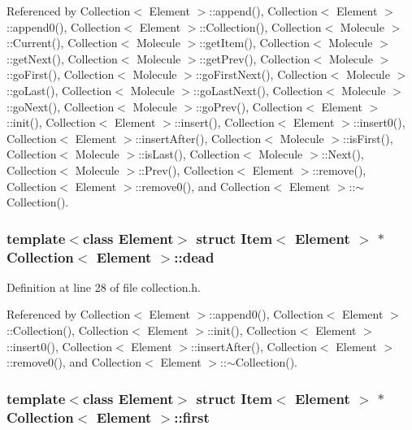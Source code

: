 Referenced by Collection$<$ Element $>$::append(), Collection$<$ Element $>$::append0(), Collection$<$ Element $>$::Collection(), Collection$<$ Molecule $>$::Current(), Collection$<$ Molecule $>$::getItem(), Collection$<$ Molecule $>$::getNext(), Collection$<$ Molecule $>$::getPrev(), Collection$<$ Molecule $>$::goFirst(), Collection$<$ Molecule $>$::goFirstNext(), Collection$<$ Molecule $>$::goLast(), Collection$<$ Molecule $>$::goLastNext(), Collection$<$ Molecule $>$::goNext(), Collection$<$ Molecule $>$::goPrev(), Collection$<$ Element $>$::init(), Collection$<$ Element $>$::insert(), Collection$<$ Element $>$::insert0(), Collection$<$ Element $>$::insertAfter(), Collection$<$ Molecule $>$::isFirst(), Collection$<$ Molecule $>$::isLast(), Collection$<$ Molecule $>$::Next(), Collection$<$ Molecule $>$::Prev(), Collection$<$ Element $>$::remove(), Collection$<$ Element $>$::remove0(), and Collection$<$ Element $>$::$\sim$Collection().\hypertarget{classCollection_f67771496391118583fcebee252a96cc}{
\subsubsection[{dead}]{\setlength{\rightskip}{0pt plus 5cm}template$<$class Element$>$ struct {\bf Item}$<$ Element $>$ $\ast$ {\bf Collection}$<$ Element $>$::{\bf dead}}}
\label{classCollection_f67771496391118583fcebee252a96cc}




Definition at line 28 of file collection.h.

Referenced by Collection$<$ Element $>$::append0(), Collection$<$ Element $>$::Collection(), Collection$<$ Element $>$::init(), Collection$<$ Element $>$::insert0(), Collection$<$ Element $>$::insertAfter(), Collection$<$ Element $>$::remove0(), and Collection$<$ Element $>$::$\sim$Collection().\hypertarget{classCollection_976b583be3920e77c69b754e09d0cae4}{
\subsubsection[{first}]{\setlength{\rightskip}{0pt plus 5cm}template$<$class Element$>$ struct {\bf Item}$<$ Element $>$ $\ast$ {\bf Collection}$<$ Element $>$::{\bf first}}}
\label{classCollection_976b583be3920e77c69b754e09d0cae4}




